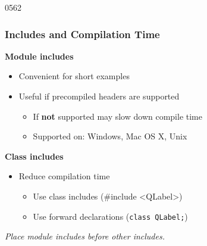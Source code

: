 \begin{slide}[fragile]{0562}\frametitle{Includes and Compilation Time} 
  \textbf{Module includes}
  \begin{itemize}
  \begin{cpp}
#include <QtCore>
  \end{cpp}
\item Convenient for short examples  
\item Useful if precompiled headers are supported
  \begin{itemize}
  \item If \textbf{not} supported may slow down compile time
  \item Supported on: Windows, Mac OS X, Unix \\
  \end{itemize}
 \end{itemize}
\textbf{Class includes}
\begin{itemize}
 \begin{cpp}
#include <QLabel>
  \end{cpp}
   \item Reduce compilation time
     \begin{itemize}
     \item Use class includes (\#include <QLabel>)
     \item Use forward declarations (\texttt{class QLabel;})
     \end{itemize}
   \end{itemize}
   \vspace{3mm}
   \textit{Place module includes before other includes.}
\end{slide}
